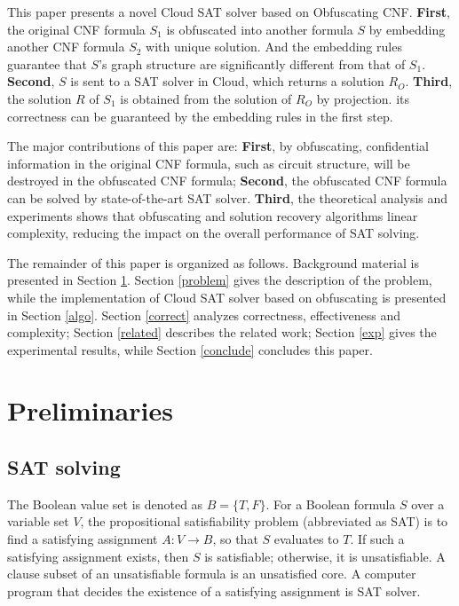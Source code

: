 \documentclass[runningheads,a4paper]{llncs}
\begin{document}
This paper presents a novel Cloud SAT solver based on Obfuscating CNF.
\textbf{First}, 
the original CNF formula $S_1$ is obfuscated into another formula $S$
by embedding another CNF formula $S_2$ with unique solution.
And the embedding rules guarantee that $S$'s graph structure are significantly different from that of $S_1$.
\textbf{Second},
$S$ is sent to a SAT solver in Cloud, 
which returns a solution $R_O$.
\textbf{Third}, 
the solution $R$ of $S_1$ is obtained from the solution of $R_O$ by projection.
its correctness can be guaranteed by the embedding rules in the first step.

The major contributions of this paper are:
\textbf{First}, by obfuscating, 
confidential information in the original CNF formula,
such as circuit structure, 
will be destroyed in the obfuscated CNF formula; 
\textbf{Second}, 
the obfuscated CNF formula can be solved by state-of-the-art SAT solver. 
\textbf{Third}, 
the theoretical analysis and experiments shows that obfuscating and solution recovery algorithms linear complexity, 
reducing the impact on the overall performance of SAT solving.

The remainder of this paper is organized as follows.
Background material is presented in Section \ref{prep}.
Section \ref{problem} gives the description of the problem, 
while the implementation of Cloud SAT solver based on obfuscating is presented in Section \ref{algo}.
Section \ref{correct} analyzes correctness, effectiveness and complexity; 
Section \ref{related} describes the related work; 
Section \ref{exp} gives the experimental results,
while Section \ref{conclude} concludes this paper.


\section{Preliminaries}\label{prep}
\subsection{SAT solving}

The Boolean value set is denoted as $B=\{T,F\}$. 
For a Boolean formula $S$ over a variable set $V$, 
the propositional satisfiability problem (abbreviated as SAT) is 
to find a satisfying assignment $A : V\to B$, 
so that $S$ evaluates to $T$. 
If such a satisfying assignment exists, 
then $S$ is satisfiable; 
otherwise,
it is unsatisfiable.
A clause subset of an unsatisfiable formula is an unsatisfied core.
A computer program that decides the existence of a
satisfying assignment is SAT solver\cite{t10}.
\end{document}
